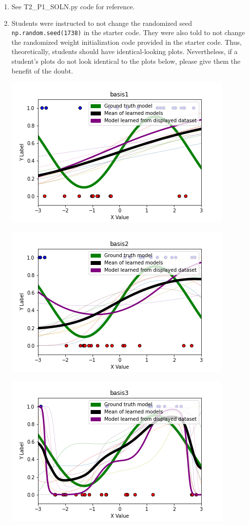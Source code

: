 \documentclass[submit]{harvardml}
\begin{document}
\begin{enumerate}


            \item

            See T2\_P1\_SOLN.py code for reference.

            \item

            Students were instructed to not change the randomized seed \verb|np.random.seed(1738)| in the starter code. They were also told to not change the randomized weight initialization code provided in the starter code. Thus, theoretically, students should have identical-looking plots. Nevertheless, if a student's plots do not look identical to the plots below, please give them the benefit of the doubt.

            \includegraphics[scale=0.5]{solutions/T2_P1_plots/basis1.png}

            \includegraphics[scale=0.5]{solutions/T2_P1_plots/basis2.png}

            \includegraphics[scale=0.5]{solutions/T2_P1_plots/basis3.png}


\end{enumerate}
\end{document}
